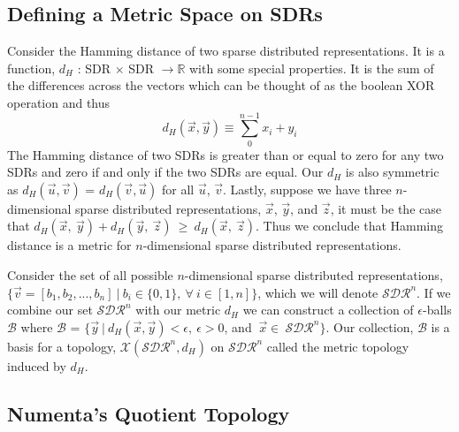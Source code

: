 \documentclass[fleqn,notitlepage,minimal]{article}
\begin{document}
	
	\subsection{Defining a Metric Space on SDRs}
	
	Consider the Hamming distance of two sparse distributed representations. It is a function, $d_{H}$ : SDR $\times$ SDR $\longrightarrow \mathbb{R}$ with some special properties. It is the sum of the differences across the vectors which can be thought of as the boolean XOR operation and thus $$d_{H}(\overrightarrow{x}, \overrightarrow{y})  \equiv \sum_{0}^{n-1} x_{i}+y_{i}$$ The Hamming distance of two SDRs is greater than or equal to zero for any two SDRs and zero if and only if the two SDRs are equal. Our $d_{H}$ is also symmetric as $d_{H}(\overrightarrow{u},\overrightarrow{v})$ = $d_{H}(\overrightarrow{v}, \overrightarrow{u})$ for all $\overrightarrow{u}$, $\overrightarrow{v}$. Lastly, suppose we have three $n$-dimensional sparse distributed representations, $\overrightarrow{x}$, $\overrightarrow{y}$, and $\overrightarrow{z}$, it must be the case that $d_{H}(\overrightarrow{x}, \ \overrightarrow{y}) + d_{H}(\overrightarrow{y}, \ \overrightarrow{z}) \: \geq \: d_{H}(\overrightarrow{x}, \ \overrightarrow{z})$. Thus we conclude that Hamming distance is a metric for $n$-dimensional sparse distributed representations. 	
	  
	Consider the set of all possible $n$-dimensional sparse distributed representations, $\{\overrightarrow{v} = [b_{1}, b_{2}, ..., b_{n}] \:| \: b_{i} \in \{0,1\}, \: \forall \: i \in [1,n] \}$, which we will denote $\mathcal{SDR}^{n}$. If we combine our set  $\mathcal{SDR}^{n}$ with our metric $d_{H}$ we can construct a collection of $\epsilon$-balls $\mathcal{B}$ where $\mathcal{B}$ = $\{\overrightarrow{y} \ | \ d_{H}(\overrightarrow{x}, \overrightarrow{y}) < \epsilon, \: \epsilon > 0$, and $\: \overrightarrow{x} \in \ \mathcal{SDR}^{n}\}$. Our collection, $\mathcal{B}$ is a basis for a topology, $\mathcal{X}(\mathcal{SDR}^{n}, d_{H})$ on $\mathcal{SDR}^{n}$ called the metric topology induced by $d_{H}$.
	
	\subsection{Numenta's Quotient Topology}
	
\end{document}
